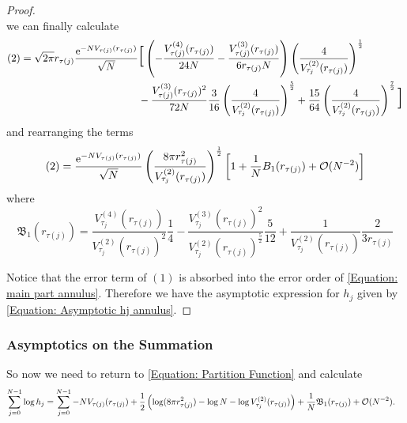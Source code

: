 \begin{proof}
\begin{equation}
\end{equation}
we can finally calculate
\begin{align}
	(2) = \sqrt{2\pi} r_{\tau(j)} \frac{\ee^{-N V_{\tau(j)}(r_{\tau(j)})}}{\sqrt{N}} 
	& \scalebox{2}{[}
	\left(- \frac{V^{(4)}_{\tau(j)}(r_{\tau(j)})}{24 N} - \frac{V^{(3)}_{\tau(j)}(r_{\tau(j)})}{6 r_{\tau(j)} N} \right) \left( \frac{4}{V^{(2)}_{\tau_j}(r_{\tau(j)})} \right)^{\frac{1}{2}} \\
	& - \frac{V^{(3)}_{\tau(j)}(r_{\tau(j)})^2}{72 N}
	\frac{3}{16} \left(\frac{4}{V^{(2)}_{\tau_j}(r_{\tau(j)})} \right)^{\frac{5}{2}} +
	\frac{15}{64} \left( \frac{4}{V^{(2)}_{\tau_j}(r_{\tau(j)})} \right)^{\frac{7}{2}}
	\scalebox{2}{]}
\end{align}
and rearranging the terms
\begin{equation}
	(2) =  \frac{\operatorname{e}^{-N V_{\tau(j)}(r_{\tau(j)})}}{\sqrt{N}} \left( \frac{8\pi r_{\tau(j)}^2}{V^{(2)}_{\tau_j}(r_{\tau(j)})} \right)^{\frac{1}{2}} \left[ 1 + \frac{1}{N} B_1(r_{\tau(j)}) + \mathcal{O}(N^{-2}) \right]
	\label{Equation: main part annulus}
\end{equation}
where
\begin{equation}
	\mathfrak{B}_1(r_{\tau(j)})  = \frac{V^{(4)}_{\tau_j}(r_{\tau(j)})}{V^{(2)}_{\tau_j}(r_{\tau(j)})^2} \frac{1}{4} - \frac{V^{(3)}_{\tau_j}(r_{\tau(j)})^2}{V^{(2)}_{\tau_j}(r_{\tau(j)})^{\frac{5}{2}}} \frac{5}{12} + \frac{1}{V^{(2)}_{\tau_j}(r_{\tau(j)})} \frac{2}{3 r_{\tau(j)}}
\end{equation}

Notice that the error term of $(1)$ is absorbed into the error order of \ref{Equation: main part annulus}. Therefore we have the asymptotic expression for $h_j$ given by \eqref{Equation: Asymptotic hj annulus}.

\end{proof}

\subsubsection{Asymptotics on the Summation}

 So now we need to return to  \eqref{Equation: Partition Function} and calculate 
\begin{align}
	\sum_{j=0}^{N-1} \log{h_j} & = \sum_{j=0}^{N-1} -N V_{\tau(j)}(r_{\tau(j)}) + \frac{1}{2} \left(\log(8\pi r^2_{\tau(j)}) - \log N - \log V^{(2)}_{\tau_j}(r_{\tau(j)}) \right) + \frac{1}{N} \mathfrak{B}_1(r_{\tau(j)}) + \mathcal{O}(N^{-2}). 
	\label{Equation: sum log annulus}
\end{align}

